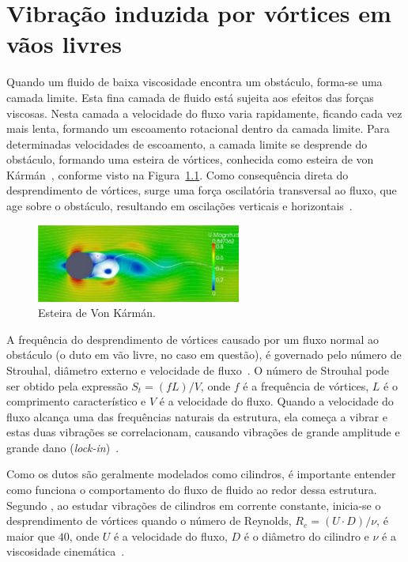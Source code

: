\chapter{Vibração induzida por vórtices em vãos livres}\label{chap:viv}

Quando um fluido de baixa viscosidade encontra um obstáculo, forma-se uma camada limite.
Esta fina camada de fluido está sujeita aos efeitos das forças viscosas.
Nesta camada a velocidade do fluxo varia rapidamente, ficando cada vez mais lenta, formando um escoamento rotacional dentro da camada limite.
Para determinadas velocidades de escoamento, a camada limite se desprende do obstáculo, formando uma esteira de vórtices, conhecida como esteira de von Kármán~\cite{Currie2002}, conforme visto na Figura~\ref{fig:viv_shading}.
Como consequência direta do desprendimento de vórtices, surge uma força oscilatória transversal ao fluxo, que age sobre o obstáculo, resultando em oscilações verticais e horizontais~\cite{Nielsen2002}.

\begin{figure}[!ht]
    \centering
    \caption{Esteira de Von Kármán.}\label{fig:viv_shading}
    \includegraphics[width=0.6\textwidth]{imagens/viv_shading}
\end{figure}

A frequência do desprendimento de vórtices causado por um fluxo normal ao obstáculo (o duto em vão livre, no caso em questão), é governado pelo número de Strouhal, diâmetro externo e velocidade de fluxo~\cite{Mork2003}.
O número de Strouhal pode ser obtido pela expressão $S_t = (f L) / V$, onde $f$ é a frequência de vórtices, $L$ é o comprimento característico e $V$ é a velocidade do fluxo.
Quando a velocidade do fluxo alcança uma das frequências naturais da estrutura, ela começa a vibrar e estas duas vibrações se correlacionam, causando vibrações de grande amplitude e grande dano (\textit{lock-in})~\cite{Mork2003}.

Como os dutos são geralmente modelados como cilindros, é importante entender como funciona o comportamento do fluxo de fluido ao redor dessa estrutura. Segundo , ao estudar vibrações de cilindros em corrente constante, inicia-se o desprendimento de vórtices quando o número de Reynolds, $R_e = (U\cdot D)/\nu$, é maior que $40$, onde $U$ é a velocidade do fluxo, $D$ é o diâmetro do cilindro e $\nu$ é a viscosidade cinemática~\cite{Sumer1995}.

